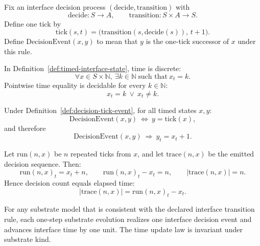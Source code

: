 \begin{definition}\label{def:decision-tick-event}
Fix an interface decision process $(\mathrm{decide},\mathrm{transition})$ with
\[
\mathrm{decide}:S\to A,\qquad \mathrm{transition}:S\times A\to S.
\]
Define one tick by
\[
\mathrm{tick}(s,t)=\bigl(\mathrm{transition}(s,\mathrm{decide}(s)),\,t+1\bigr).
\]
Define $\mathrm{DecisionEvent}(x,y)$ to mean that $y$ is the one-tick successor of $x$ under this rule.
\end{definition}

\begin{proposition}\label{prop:time-discrete}
In Definition~\ref{def:timed-interface-state}, time is discrete:
\[
\forall x\in S\times\mathbb{N},\ \exists k\in\mathbb{N}\ \text{such that}\ x_t=k.
\]
Pointwise time equality is decidable for every $k\in\mathbb{N}$:
\[
x_t=k\ \vee\ x_t\neq k.
\]
\end{proposition}

\begin{proposition}\label{prop:decision-unit-time}
Under Definition~\ref{def:decision-tick-event}, for all timed states $x,y$:
\[
\mathrm{DecisionEvent}(x,y)\ \Longleftrightarrow\ y=\mathrm{tick}(x),
\]
and therefore
\[
\mathrm{DecisionEvent}(x,y)\ \Longrightarrow\ y_t=x_t+1.
\]
\end{proposition}

\begin{proposition}\label{prop:run-time-accounting}
Let $\mathrm{run}(n,x)$ be $n$ repeated ticks from $x$, and let $\mathrm{trace}(n,x)$ be the emitted decision sequence. Then:
\[
\mathrm{run}(n,x)_t = x_t + n,\qquad
\mathrm{run}(n,x)_t - x_t = n,\qquad
|\mathrm{trace}(n,x)|=n.
\]
Hence decision count equals elapsed time:
\[
|\mathrm{trace}(n,x)|=\mathrm{run}(n,x)_t-x_t.
\]
\end{proposition}

\begin{proposition}\label{prop:substrate-unit-time}
For any substrate model that is consistent with the declared interface transition rule, each one-step substrate evolution realizes one interface decision event and advances interface time by one unit. The time update law is invariant under substrate kind.
\end{proposition}

